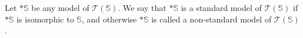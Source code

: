 Let $*\mathbb{S}$ be any model of $\mathcal{T}(\mathbb{S})$. We say that $*\mathbb{S}$ is a standard model of $\mathcal{T}(\mathbb{S})$ if $*\mathbb{S}$ is isomorphic to $\mathbb{S}$, and otherwise $*\mathbb{S}$ is called a non-standard model of $\mathcal{T}(\mathbb{S})$.
